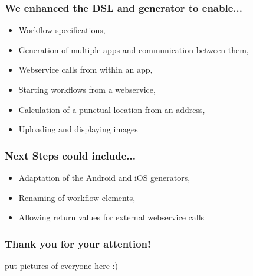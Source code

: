 \begin{frame}[t]
    \frametitle{We enhanced the DSL and generator to enable...}
    
    \begin{itemize}
    	\item Workflow specifications,
    	\item Generation of multiple apps and communication between them,
    	\item Webservice calls from within an app,
    	\item Starting workflows from a webservice,
    	\item Calculation of a punctual location from an address,
    	\item Uploading and displaying images
    \end{itemize}

\end{frame}

\begin{frame}[t]
    \frametitle{Next Steps could include...}

	\begin{itemize}
		\item Adaptation of the Android and iOS generators,
		\item Renaming of workflow elements,
		\item Allowing return values for external webservice calls
	\end{itemize}
\end{frame}

\begin{frame}
\frametitle{Thank you for your attention!}

put pictures of everyone here :)
\end{frame}
